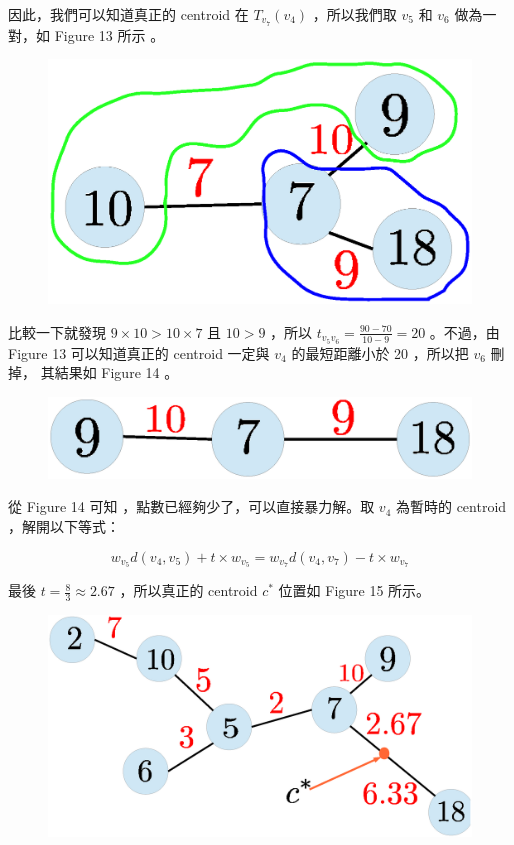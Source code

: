 \documentclass[12pt]{article}
\begin{document}
\begin{CJK}{UTF8}{bkai}
因此，我們可以知道真正的 centroid 在 $T_{v_7}(v_4)$ ，所以我們取 $v_5$ 和 $v_6$ 做為一對，如 Figure 13 所示 。

\begin{figure}[H]
\centering
\includegraphics[scale=0.3]{fig13.eps}
\caption{}
\end{figure}

比較一下就發現 $9 \times 10 > 10 \times 7$ 且 $10 > 9$ ，所以 $t_{v_5v_6}=\frac{90-70}{10-9}=20$ 。不過，由 Figure 13
可以知道真正的 centroid 一定與 $v_4$ 的最短距離小於 20 ，所以把 $v_6$ 刪掉， 其結果如 Figure 14 。

\begin{figure}[H]
\centering
\includegraphics[scale=0.3]{fig14.eps}
\caption{}
\end{figure}

從 Figure 14 可知 ，點數已經夠少了，可以直接暴力解。取 $v_4$ 為暫時的 centroid ，解開以下等式：

\begin{equation}
w_{v_5}d(v_4,v_5)+t \times w_{v_5}=w_{v_7}d(v_4,v_7)-t \times w_{v_7}
\end{equation}

最後 $t=\frac{8}{3}\approx 2.67$ ，所以真正的 centroid $c^*$ 位置如 Figure 15 所示。

\begin{figure}[H]
\centering
\includegraphics[scale=0.3]{fig15.eps}
\caption{}
\end{figure}


\end{CJK}
\end{document}
